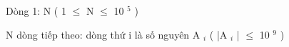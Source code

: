 Dòng 1: N ( 1  $\le$  N  $\le$  10   $^    5   $   )  

   N dòng tiếp theo: dòng thứ  i  là số nguyên  A   $_    i   $   ( |A   $_    i   $   |  $\le$  10   $^    9   $   )